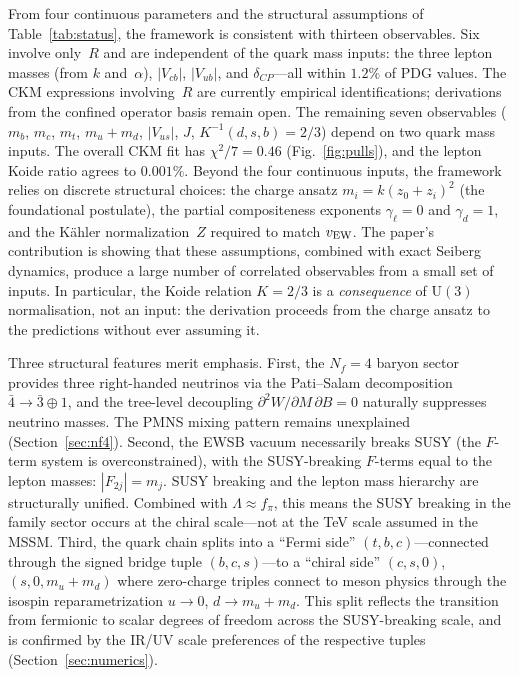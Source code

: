 \documentclass[12pt,a4paper]{article}
\newcommand{\UU}{\mathrm{U}}
\newcommand{\Nf}{N_f}
\begin{document}
From four continuous parameters and the structural assumptions of
Table~\ref{tab:status}, the framework is consistent with thirteen
observables. Six involve only~$R$ and are independent of the quark mass
inputs: the three lepton masses (from $k$ and~$\alpha$), $|V_{cb}|$,
$|V_{ub}|$, and $\delta_{CP}$---all within $1.2\%$ of PDG values.
The CKM expressions involving~$R$ are currently empirical identifications;
derivations from the confined operator basis remain open.
The remaining seven observables
($m_b$, $m_c$, $m_t$, $m_u{+}m_d$, $|V_{us}|$, $J$,
$K^{-1}(d,s,b){=}2/3$) depend on two quark mass inputs.
The overall CKM fit has $\chi^2/7 = 0.46$
(Fig.~\ref{fig:pulls}), and the lepton Koide ratio agrees to
$0.001\%$.
Beyond the four continuous inputs, the framework relies on
discrete structural choices: the charge ansatz $m_i = k(z_0+z_i)^2$
(the foundational postulate), the partial compositeness exponents
$\gamma_\ell = 0$ and $\gamma_d = 1$, and the K\"ahler
normalization~$Z$ required to match $v_{\rm EW}$.
The paper's contribution is showing that these assumptions, combined
with exact Seiberg dynamics, produce a large number of correlated
observables from a small set of inputs. In particular, the Koide
relation $K = 2/3$ is a \emph{consequence} of $\UU(3)$
normalisation, not an input: the derivation proceeds from
the charge ansatz to the predictions without ever assuming it.

Three structural features merit emphasis. First, the $\Nf=4$ baryon
sector provides three right-handed neutrinos via the Pati--Salam
decomposition $\bar 4 \to \bar 3 \oplus 1$, and the tree-level
decoupling $\partial^2 W/\partial M\,\partial B = 0$ naturally
suppresses neutrino masses. The PMNS mixing pattern remains
unexplained (Section~\ref{sec:nf4}).
Second, the EWSB vacuum necessarily breaks SUSY (the
$F$-term system is overconstrained), with the SUSY-breaking
$F$-terms equal to the lepton masses:
$|F_{2j}| = m_j$. SUSY breaking and the lepton mass hierarchy
are structurally unified. Combined with
$\Lambda \approx f_\pi$, this means the SUSY breaking in the
family sector occurs at the chiral scale---not at the
TeV scale assumed in the MSSM.
Third, the quark chain splits into a ``Fermi side'' $(t,b,c)$---connected
through the signed bridge tuple $(b,c,s)$---to a ``chiral
side'' $(c,s,0)$,~$(s,0,m_u{+}m_d)$ where zero-charge triples
connect to meson physics through the isospin reparametrization
$u\to 0$, $d \to m_u{+}m_d$. This split reflects the
transition from fermionic to scalar degrees of freedom across the
SUSY-breaking scale, and is confirmed by the IR/UV scale preferences
of the respective tuples (Section~\ref{sec:numerics}).
\end{document}
